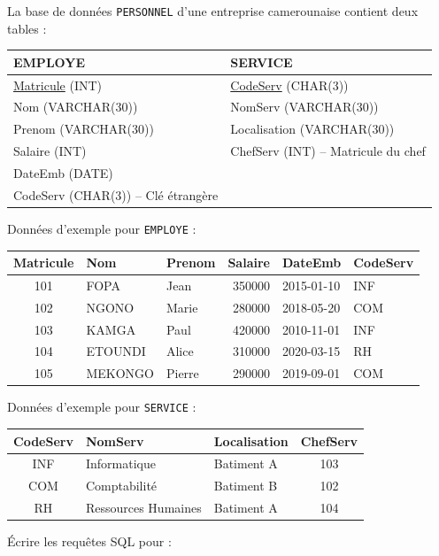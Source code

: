 \documentclass[11pt]{article}
\begin{document}
\begin{exercice}
La base de données \texttt{PERSONNEL} d'une entreprise camerounaise contient deux tables :
\begin{center}
\begin{tabular}{|l|l|}
\hline
\textbf{EMPLOYE} & \textbf{SERVICE} \\ \hline
\underline{Matricule} (INT) & \underline{CodeServ} (CHAR(3)) \\
Nom (VARCHAR(30)) & NomServ (VARCHAR(30)) \\
Prenom (VARCHAR(30)) & Localisation (VARCHAR(30)) \\
Salaire (INT) & ChefServ (INT) -- Matricule du chef \\
DateEmb (DATE) & \\
CodeServ (CHAR(3)) -- Clé étrangère & \\
\hline
\end{tabular}
\end{center}
Données d'exemple pour \texttt{EMPLOYE} :
\begin{center}
\begin{tabular}{|c|l|l|r|l|l|}
\hline
Matricule & Nom & Prenom & Salaire & DateEmb & CodeServ \\ \hline
101 & FOPA & Jean & 350000 & 2015-01-10 & INF \\
102 & NGONO & Marie & 280000 & 2018-05-20 & COM \\
103 & KAMGA & Paul & 420000 & 2010-11-01 & INF \\
104 & ETOUNDI & Alice & 310000 & 2020-03-15 & RH \\
105 & MEKONGO & Pierre & 290000 & 2019-09-01 & COM \\
\hline
\end{tabular}
\end{center}
Données d'exemple pour \texttt{SERVICE} :
\begin{center}
\begin{tabular}{|c|l|l|c|}
\hline
CodeServ & NomServ & Localisation & ChefServ \\ \hline
INF & Informatique & Batiment A & 103 \\
COM & Comptabilité & Batiment B & 102 \\
RH & Ressources Humaines & Batiment A & 104 \\
\hline
\end{tabular}
\end{center}
Écrire les requêtes SQL pour :
\begin{enumerate}

\end{enumerate}
\end{exercice}
\end{document}
